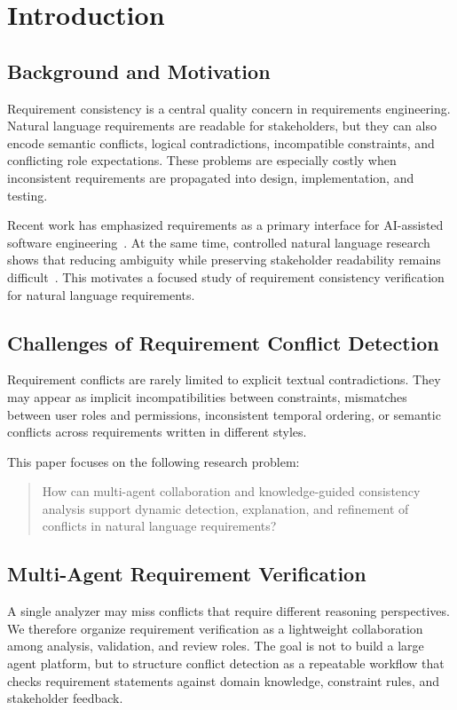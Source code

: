 \section{Introduction}
\label{introduction}

\subsection{Background and Motivation}
Requirement consistency is a central quality concern in requirements engineering.
Natural language requirements are readable for stakeholders, but they can also encode
semantic conflicts, logical contradictions, incompatible constraints, and conflicting
role expectations. These problems are especially costly when inconsistent
requirements are propagated into design, implementation, and testing.

Recent work has emphasized requirements as a primary interface for AI-assisted
software engineering~\cite{robinsonRequirementsAreAll2025,hanArchCodeIncorporatingSoftware2024}.
At the same time, controlled natural language research shows that reducing ambiguity
while preserving stakeholder readability remains difficult~\cite{darifControlledNaturalLanguage2026}.
This motivates a focused study of requirement consistency verification for natural
language requirements.

\subsection{Challenges of Requirement Conflict Detection}
Requirement conflicts are rarely limited to explicit textual contradictions.
They may appear as implicit incompatibilities between constraints, mismatches between
user roles and permissions, inconsistent temporal ordering, or semantic conflicts
across requirements written in different styles.

This paper focuses on the following research problem:
\begin{quote}
How can multi-agent collaboration and knowledge-guided consistency analysis support
dynamic detection, explanation, and refinement of conflicts in natural language
requirements?
\end{quote}

\subsection{Multi-Agent Requirement Verification}
A single analyzer may miss conflicts that require different reasoning perspectives.
We therefore organize requirement verification as a lightweight collaboration among
analysis, validation, and review roles. The goal is not to build a large agent
platform, but to structure conflict detection as a repeatable workflow that checks
requirement statements against domain knowledge, constraint rules, and stakeholder
feedback.

